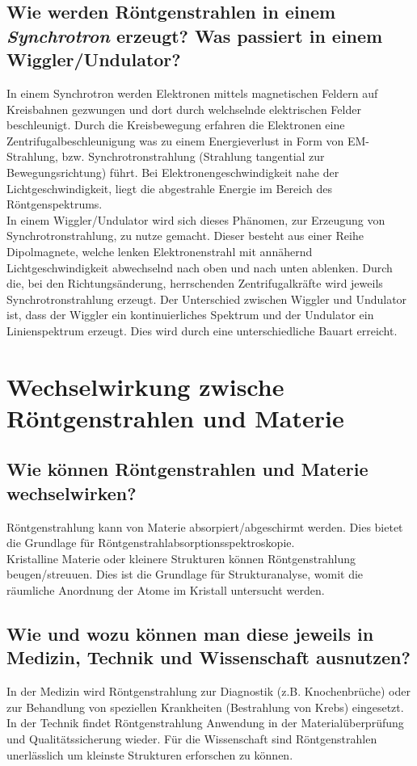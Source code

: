 \subsection*{Wie werden Röntgenstrahlen in einem \textit{Synchrotron} erzeugt? Was passiert in einem Wiggler/Undulator?}
In einem Synchrotron werden Elektronen mittels magnetischen Feldern auf Kreisbahnen gezwungen und dort durch welchselnde elektrischen Felder beschleunigt.
Durch die Kreisbewegung erfahren die Elektronen eine Zentrifugalbeschleunigung was zu einem Energieverlust in Form von EM-Strahlung, bzw. Synchrotronstrahlung (Strahlung tangential zur Bewegungsrichtung) führt. Bei Elektronengeschwindigkeit nahe der Lichtgeschwindigkeit, liegt die abgestrahle Energie im Bereich des Röntgenspektrums. \cite{Gerthsen}\\
In einem Wiggler/Undulator wird sich dieses Phänomen, zur Erzeugung von Synchrotronstrahlung, zu nutze gemacht.
Dieser besteht aus einer Reihe Dipolmagnete, welche lenken Elektronenstrahl mit annähernd Lichtgeschwindigkeit abwechselnd nach oben und nach unten ablenken.
Durch die, bei den Richtungsänderung, herrschenden Zentrifugalkräfte wird jeweils Synchrotronstrahlung erzeugt.
Der Unterschied zwischen Wiggler und Undulator ist, dass der Wiggler ein kontinuierliches Spektrum und der Undulator ein Linienspektrum erzeugt.
Dies wird durch eine unterschiedliche Bauart erreicht.\newpage
\section{Wechselwirkung zwische Röntgenstrahlen und Materie}
\subsection*{Wie können Röntgenstrahlen und Materie wechselwirken?}
Röntgenstrahlung kann von Materie absorpiert/abgeschirmt werden.
Dies bietet die Grundlage für Röntgenstrahlabsorptionsspektroskopie.\vspace{6pt}\\
Kristalline Materie oder kleinere Strukturen können Röntgenstrahlung beugen/streuuen.
Dies ist die Grundlage für Strukturanalyse, womit die räumliche Anordnung der Atome im Kristall untersucht werden.
\subsection*{Wie und wozu können man diese jeweils in Medizin, Technik und Wissenschaft ausnutzen?}
In der Medizin wird Röntgenstrahlung zur Diagnostik (z.B. Knochenbrüche) oder zur Behandlung von speziellen Krankheiten (Bestrahlung von Krebs) eingesetzt.
In der Technik findet Röntgenstrahlung Anwendung in der Materialüberprüfung und Qualitätssicherung wieder.
Für die Wissenschaft sind Röntgenstrahlen unerlässlich um kleinste Strukturen erforschen zu können.
